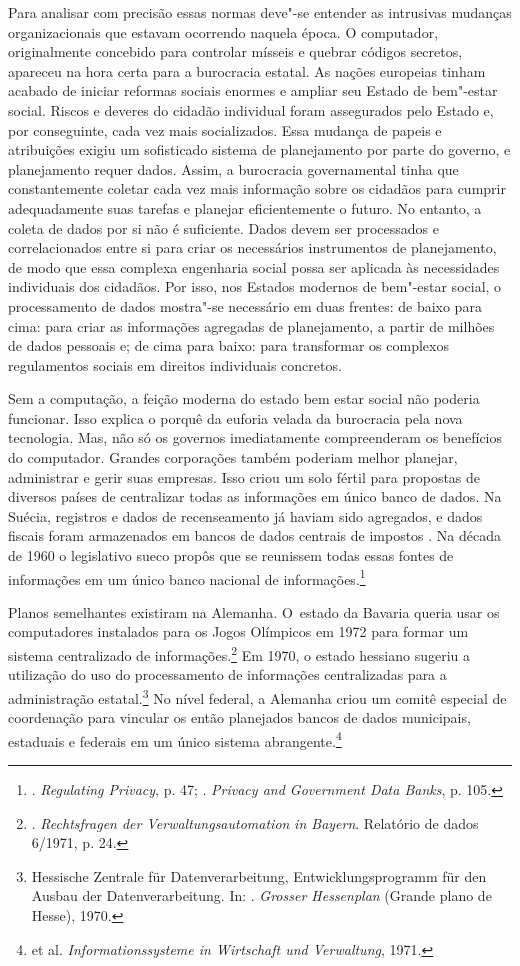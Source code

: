 Para analisar com precisão essas normas deve"-se entender as intrusivas
mudanças organizacionais que estavam ocorrendo naquela época. O
computador, originalmente concebido para controlar mísseis e quebrar
códigos secretos, apareceu na hora certa para a burocracia estatal. As
nações europeias tinham acabado de iniciar reformas sociais enormes e
ampliar seu Estado de bem"-estar social. Riscos e deveres do cidadão
individual foram assegurados pelo Estado e, por conseguinte, cada vez
mais socializados. Essa mudança de papeis e atribuições exigiu um
sofisticado sistema de planejamento por parte do governo, e planejamento
requer dados. Assim, a burocracia governamental tinha que constantemente
coletar cada vez mais informação sobre os cidadãos para cumprir
adequadamente suas tarefas e planejar eficientemente o futuro. No
entanto, a coleta de dados por si não é suficiente. Dados devem ser
processados e correlacionados entre si para criar os necessários
instrumentos de planejamento, de modo que essa complexa engenharia
social possa ser aplicada às necessidades individuais dos cidadãos. Por
isso, nos Estados modernos de bem"-estar social, o processamento de dados
mostra"-se necessário em duas frentes: de baixo para cima: para criar as
informações agregadas de planejamento, a partir de milhões de dados
pessoais e; de cima para baixo: para transformar os complexos
regulamentos sociais em direitos individuais concretos.

Sem a computação, a feição moderna do estado bem estar social não
poderia funcionar. Isso explica o porquê da euforia velada da burocracia
pela nova tecnologia. Mas, não só os governos imediatamente
compreenderam os benefícios do computador. Grandes corporações também
poderiam melhor planejar, administrar e gerir suas empresas. Isso criou
um solo fértil para propostas de diversos países de centralizar todas as
informações em único banco de dados. Na Suécia, registros e dados de
recenseamento já haviam sido agregados, e dados fiscais foram
armazenados em bancos de dados centrais de impostos . Na década de 1960
o legislativo sueco propôs que se reunissem todas essas fontes de
informações em um único banco nacional de informações.\footnote{.
  \emph{Regulating Privacy}, p. 47; . \emph{Privacy and
  Government Data Banks}, p. 105.}

Planos semelhantes existiram na Alemanha. O~estado da Bavaria queria
usar os computadores instalados para os Jogos Olímpicos em 1972 para
formar um sistema centralizado de informações.\footnote{.
  \emph{Rechtsfragen der Verwaltungsautomation} \emph{in Bayern}.
  Relatório de dados 6/1971, p. 24.} Em 1970, o estado hessiano sugeriu
a utilização do uso do processamento de informações centralizadas para a
administração estatal.\footnote{Hessische Zentrale für
  Datenverarbeitung, Entwicklungsprogramm für den Ausbau der
  Datenverarbeitung. In: . \emph{Grosser Hessenplan} (Grande plano
  de Hesse), 1970.} No nível federal, a Alemanha criou um comitê
especial de coordenação para vincular os então planejados bancos de
dados municipais, estaduais e federais em um único sistema
abrangente.\footnote{ et al. \emph{Informationssysteme in
  Wirtschaft und Verwaltung}, 1971.}

